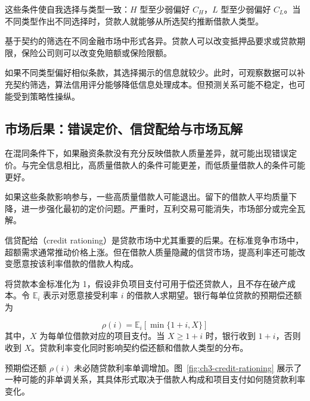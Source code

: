 这些条件使自我选择与类型一致：$H$ 型至少弱偏好 $C_H$，$L$ 型至少弱偏好 $C_L$。当不同类型作出不同选择时，贷款人就能够从所选契约推断借款人类型。

基于契约的筛选在不同金融市场中形式各异。贷款人可以改变抵押品要求或贷款期限，保险公司则可以改变免赔额或保险限额。

如果不同类型偏好相似条款，其选择揭示的信息就较少。此时，可观察数据可以补充契约筛选，算法信用评分能够降低信息处理成本。但预测关系可能不稳定，也可能受到策略性操纵。

\subsection{市场后果：错误定价、信贷配给与市场瓦解}

在混同条件下，如果融资条款没有充分反映借款人质量差异，就可能出现错误定价。与完全信息相比，高质量借款人的条件可能更差，而低质量借款人的条件可能更好。

如果这些条款影响参与，一些高质量借款人可能退出。留下的借款人平均质量下降，进一步强化最初的定价问题。严重时，互利交易可能消失，市场部分或完全瓦解。

信贷配给（credit rationing）是贷款市场中尤其重要的后果。在标准竞争市场中，超额需求通常推动价格上涨。但在借款人质量隐藏的信贷市场，提高利率还可能改变愿意按该利率借款的借款人构成。

将贷款本金标准化为 1，假设非负项目支付可用于偿还贷款人，且不存在破产成本。令 \(\mathbb{E}_i\) 表示对愿意接受利率 \(i\) 的借款人求期望。银行每单位贷款的预期偿还额为

\begin{equation}
\rho(i)=\mathbb{E}_i[\min\{1+i,X\}]
\label{eq:ch3-bank-return}
\end{equation}
其中，$X$ 为每单位借款对应的项目支付。当 $X\geq 1+i$ 时，银行收到 $1+i$，否则收到 $X$。贷款利率变化同时影响契约偿还额和借款人类型的分布。


预期偿还额 $\rho(i)$ 未必随贷款利率单调增加。图~\ref{fig:ch3-credit-rationing} 展示了一种可能的非单调关系，其具体形式取决于借款人构成和项目支付如何随贷款利率变化。

